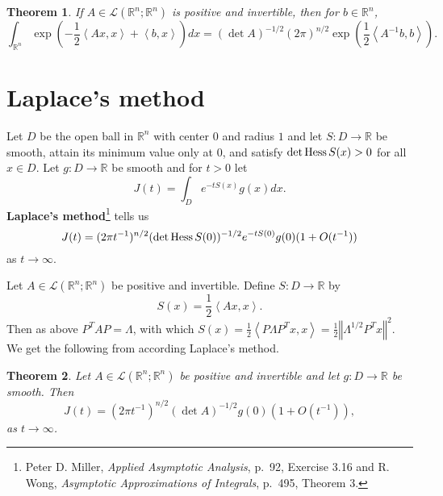 \documentclass{article}
\newcommand{\inner}[2]{\left\langle #1, #2 \right\rangle}
\newcommand{\Hess}{\ensuremath\mathrm{Hess}\,}
\newcommand{\norm}[1]{\left\Vert #1 \right\Vert}
\newtheorem{theorem}{Theorem}
\theoremstyle{definition}
\begin{document}
\begin{theorem}
If $A \in \mathscr{L}(\mathbb{R}^n;\mathbb{R}^n)$ is positive and invertible, then for $b \in \mathbb{R}^n$,
\[
\int_{\mathbb{R}^n} \exp\left(-\frac{1}{2}\inner{Ax}{x}+\inner{b}{x} \right)dx
=(\det A)^{-1/2} (2\pi)^{n/2} \exp\left(\frac{1}{2} \inner{A^{-1}b}{b}\right).
\]
\end{theorem}


\section{Laplace's method}
Let $D$ be the open ball in $\mathbb{R}^n$ with center $0$ and radius $1$ and let
$S:D \to \mathbb{R}$ be smooth, attain its minimum value only at $0$, and satisfy 
$\det \Hess S(x) >0$ for all $x \in D$.
Let $g:D \to \mathbb{R}$ be smooth and for $t>0$ let
\[
J(t) = \int_D e^{-t S(x)} g(x) dx.
\]
\textbf{Laplace's method}\footnote{Peter D. Miller, {\em Applied Asymptotic Analysis},
p.~92, Exercise 3.16 and 
R. Wong, {\em Asymptotic Approximations of Integrals}, p.~495, Theorem 3.} tells us
\[
J(t) = (2\pi t^{-1})^{n/2} (\det \Hess S(0))^{-1/2} e^{-tS(0)} g(0) (1+O(t^{-1}))
\]
as $t \to \infty$. 

Let $A \in \mathscr{L}(\mathbb{R}^n;\mathbb{R}^n)$ be positive and invertible. 
Define $S:D \to \mathbb{R}$ by
\[
S(x) = \frac{1}{2} \inner{Ax}{x}.
\]
Then as above $P^T A P =\Lambda$, with which
$S(x) = \frac{1}{2}\inner{P\Lambda P^Tx}{x}
=\frac{1}{2} \norm{\Lambda^{1/2} P^T x}^2$.  We get the following from  according  Laplace's method.

\begin{theorem}
Let $A \in \mathscr{L}(\mathbb{R}^n;\mathbb{R}^n)$ be positive and invertible and let $g:D \to \mathbb{R}$ be smooth.
Then
\[
J(t) = (2\pi t^{-1})^{n/2} (\det A)^{-1/2} g(0)(1+O(t^{-1})),
\]
as $t \to \infty$. 
\end{theorem}
\end{document}
